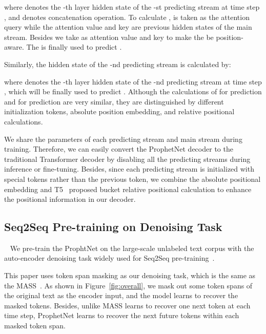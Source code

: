 \documentclass[11pt,a4paper]{article}
\begin{document}
\begin{small}

\end{small}
where  denotes the -th layer hidden state of the -st predicting stream at time step , and  denotes concatenation operation. To calculate ,  is taken as the attention query while the attention value and key are previous  hidden states of the main stream. Besides we take  as attention value and key to make the  be position-aware. The  is finally used to predict .

Similarly, the hidden state of the -nd predicting stream is calculated by:

\begin{small}

\end{small}
where  denotes the -th layer hidden state of the -nd predicting stream at time step , which will be finally used to predict .
Although the calculations of  for  prediction and  for  prediction are very similar, they are distinguished by different initialization tokens, absolute position embedding, and relative positional calculations.

We share the parameters of each predicting stream and main stream during training. 
Therefore, we can easily convert the ProphetNet decoder to the traditional Transformer decoder by disabling all the predicting streams during inference or fine-tuning. Besides, since each predicting stream is initialized with special tokens rather than the previous token, we combine the absolute positional embedding and T5~\cite{raffel2019exploring} proposed bucket relative positional calculation to enhance the positional information in our decoder. 

\subsection{Seq2Seq Pre-training on Denoising Task}~\label{sec:m4}
We pre-train the ProphtNet on the large-scale unlabeled text corpus with the auto-encoder denoising task widely used for Seq2Seq pre-training~\cite{song2019mass, lewis2019bart, raffel2019exploring}. 




This paper uses token span masking as our denoising task, which is the same as the MASS~\cite{song2019mass}.
As shown in Figure~\ref{fig:overall}, we mask out some token spans of the original text as the encoder input, and the model learns to recover the masked tokens.
Besides, unlike MASS learns to recover one next token at each time step, ProphetNet learns to recover the next  future tokens within each masked token span.
\end{document}
